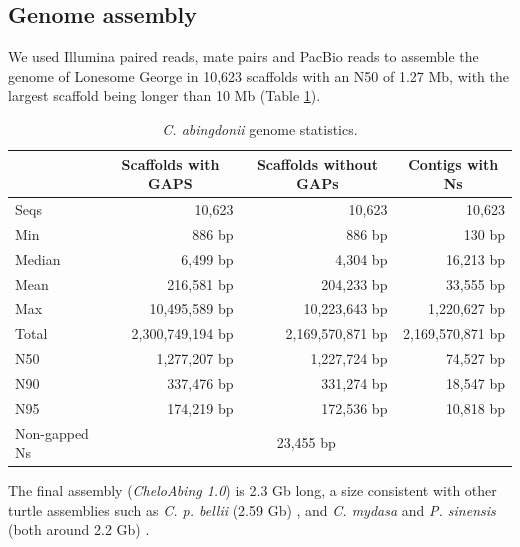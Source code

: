 \subsection{Genome assembly} \label{ss_george_genome_results_assembly}

We used Illumina paired reads, mate pairs and PacBio reads to assemble the genome of Lonesome George in 10,623 scaffolds with an N50 of 1.27 Mb, with the largest scaffold being longer than 10 Mb (Table \ref{t_george_statistics}).

\begin{table}[h]
    \centering
    \caption[\textit{C. abingdonii} genome statistics]{\footnotesize \textit{C. abingdonii} genome statistics.}
    \begin{tabular}{lrrr}
        \hline \hline
        & \multicolumn{1}{c}{Scaffolds with GAPS} & \multicolumn{1}{c}{Scaffolds without GAPs} & \multicolumn{1}{c}{Contigs with Ns} \\ \hline \hline
        \multicolumn{1}{l}{Seqs}          & 10,623            & 10,623            & 10,623 \\
        \multicolumn{1}{l}{Min}           & 886 bp            & 886 bp            & 130 bp \\
        \multicolumn{1}{l}{Median}        & 6,499 bp          & 4,304 bp          & 16,213 bp \\
        \multicolumn{1}{l}{Mean}          & 216,581 bp        & 204,233 bp        & 33,555 bp \\
        \multicolumn{1}{l}{Max}           & 10,495,589 bp     & 10,223,643 bp     & 1,220,627 bp \\ \hline
        \multicolumn{1}{l}{Total}         & 2,300,749,194 bp  & 2,169,570,871 bp  & 2,169,570,871 bp \\
        \multicolumn{1}{l}{N50}           & 1,277,207 bp      & 1,227,724 bp      & 74,527 bp \\
        \multicolumn{1}{l}{N90}           & 337,476 bp        & 331,274 bp        & 18,547 bp \\
        \multicolumn{1}{l}{N95}           & 174,219 bp        & 172,536 bp        & 10,818 bp \\ \hline
        \multicolumn{1}{l}{Non-gapped Ns} & \multicolumn{3}{c}{23,455 bp} \\ \hline \hline
    \end{tabular}
    \label{t_george_statistics}
\end{table}

The final assembly (\emph{CheloAbing 1.0}) is 2.3 Gb long, a size consistent with other turtle assemblies such as \textit{C. p. bellii} (2.59 Gb) \cite{BradleyShaffer2013}, and {\textit{C. mydasa}} and \textit{P. sinensis} (both around 2.2 Gb) \cite{Wang2013b}.

